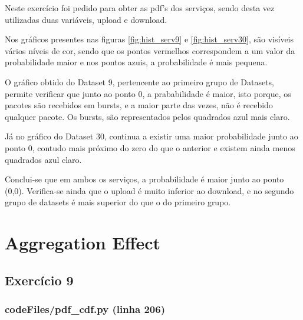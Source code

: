 \documentclass[pdftex,12pt,a4paper]{report}
\begin{document}
Neste exercício foi pedido para obter as pdf's dos serviços, sendo desta vez utilizadas duas variáveis, upload e download.

Nos gráficos presentes nas figuras \ref{fig:hist_serv9} e \ref{fig:hist_serv30}, são visíveis vários níveis de cor, sendo que os pontos vermelhos correspondem a um valor da probabilidade maior e nos pontos azuis, a probabilidade é mais pequena.

O gráfico obtido do Dataset 9, pertencente ao primeiro grupo de Datasets, permite verificar que junto ao ponto 0, a prababilidade é maior, isto porque, os pacotes são recebidos em bursts, e a maior parte das vezes, não é recebido qualquer pacote. Os bursts, são representados pelos quadrados azul mais claro.

Já no gráfico do Dataset 30, continua a existir uma maior probabilidade junto ao ponto 0, contudo mais próximo do zero do que o anterior e existem ainda menos quadrados azul claro.

Conclui-se que em ambos os serviços, a probabilidade é maior junto ao ponto (0,0). Verifica-se ainda que o upload é muito inferior ao download, e no segundo grupo de datasets é mais superior do que o do primeiro grupo.

\newpage
\section{Aggregation Effect}
\subsection{Exercício 9}
\subsubsection{codeFiles/pdf\_cdf.py (linha 206)}
\end{document}

